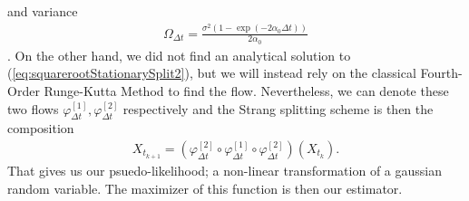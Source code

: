 and variance
\begin{align}
     \Omega_{\Delta t} = \frac{\sigma^2\left(1 - \exp\left(-2\alpha_0 \Delta t\right)\right)}{2\alpha_0}
\end{align}
\cite[(5), (6)]{SplittingSchemes}. On the other hand, we did not find an analytical solution to (\ref{eq:squarerootStationarySplit2}), but we will instead rely on the classical Fourth-Order Runge-Kutta Method \cite[p. 541]{numericalAnalysis} to find the flow. Nevertheless, we can denote these two flows $\varphi_{\Delta t}^{[1]}, \varphi_{\Delta t}^{[2]}$ respectively and the Strang splitting scheme is then the composition
\begin{align}
    X_{t_{k + 1}} = \left(\varphi_{\Delta t}^{[2]} \circ \varphi_{\Delta t}^{[1]} \circ \varphi_{\Delta t}^{[2]}\right)\left(X_{t_k}\right).
\end{align}
That gives us our psuedo-likelihood; a non-linear transformation of a gaussian random variable. The maximizer of this function is then our estimator. \\


